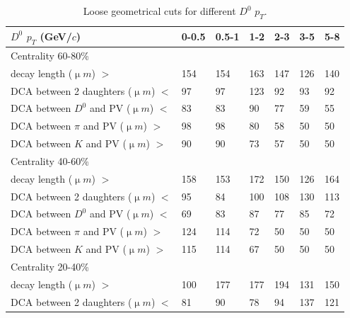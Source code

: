 \begin{table}[htp]
  \centering
  \caption{Loose geometrical cuts for different $D^0$ $p_T$.}
  \label{geometryCutsLoose}
  \begin{center}
    \begin{tabular}{l|l|l|l|l|l|l}
      $D^0$ $p_T$ (GeV/$c$) & 0-0.5 & 0.5-1 & 1-2 & 2-3 & 3-5 & 5-8\\ \hline
      Centrality  60-80\% & &  & &  & & \\ \hline
      decay length (${\upmu}m$) $>$ & 154 & 154 & 163 & 147 & 126 & 140\\ \hline
      DCA between 2 daughters (${\upmu}m$) $<$ & 97 & 97 & 123 & 92 & 93 & 92\\ \hline
      DCA between $D^0$ and PV (${\upmu}m$) $<$ & 83 & 83 & 90 & 77 & 59 & 55\\ \hline
      DCA between $\pi$ and PV (${\upmu}m$) $>$ & 98 & 98 & 80 & 58 & 50 & 50\\ \hline
      DCA between $K$ and PV (${\upmu}m$) $>$ & 90 & 90 & 73 & 57 & 50 & 50\\ \hline
      Centrality  40-60\% &  &  &  &  & & \\ \hline
      decay length (${\upmu}m$) $>$ & 158 & 153 & 172 & 150 & 126 & 164\\ \hline
      DCA between 2 daughters (${\upmu}m$) $<$ & 95 & 84 & 100 & 108 & 130 & 113\\ \hline
      DCA between $D^0$ and PV (${\upmu}m$) $<$ & 69 & 83 & 87 & 77 & 85 & 72\\ \hline
      DCA between $\pi$ and PV (${\upmu}m$) $>$ & 124 & 114 & 72 & 50 & 50 & 50\\ \hline
      DCA between $K$ and PV (${\upmu}m$) $>$ & 115 & 114 & 67 & 50 & 50 & 50\\ \hline
      Centrality  20-40\% &  &  &  &  & & \\ \hline
      decay length (${\upmu}m$) $>$ & 100 & 177 & 177 & 194 & 131 & 150\\ \hline
      DCA between 2 daughters (${\upmu}m$) $<$ & 81 & 90 & 78 & 94 & 137 & 121\\ \hline

\end{tabular}
\end{center}
\end{table}
